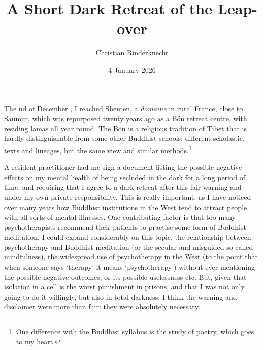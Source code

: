 \documentclass[11pt,twocolumn]{article}
\title{A Short Dark Retreat of the Leap-over}
\author{Christian Rinderknecht}
\date{4 January 2026}
\begin{document}
\maketitle


The nd of December , I reached
Shenten, a \emph{domaine} in rural France, close to Saumur, which was
repurposed twenty years ago as a Bön retreat centre, with residing
lamas all year round. The Bön is a religious tradition of Tibet that
is hardly distinguishable from some other Buddhist schools: different
scholastic, texts and lineages, but the same view and similar
methods.\footnote{One difference with the Buddhist syllabus is the
study of poetry, which goes to my heart.}

A resident practitioner had me sign a document listing the possible
negative effects on my mental health of being secluded in the dark for
a long period of time, and requiring that I agree to a dark retreat
after this fair warning and under my own private responsibility. This
is really important, as I have noticed over many years how Buddhist
institutions in the West tend to attract people with all sorts of
mental illnesses. One contributing factor is that too many
psychotherapists recommend their patients to practise some form of
Buddhist meditation. I could expand considerably on this topic, the
relationship between psychotherapy and Buddhist meditation (or the
secular and misguided so-called mindfulness), the widespread use of
psychotherapy in the West (to the point that when someone says
`therapy' it means `psychotherapy') without ever mentioning the
possible negative outcomes, or its possible uselessness etc. But,
given that isolation in a cell is the worst punishment in prisons, and
that I was not only going to do it willingly, but also in total
darkness, I think the warning and disclaimer were more than fair: they
were absolutely necessary.
\end{document}

